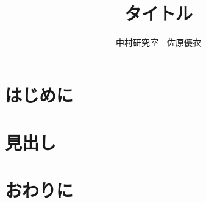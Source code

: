 \documentclass{jsarticle}
\begin{document}
\title{タイトル}
\author{中村研究室　佐原優衣}
\maketitle

\section{はじめに}
\section{見出し}
\section{おわりに}
\end{document}
